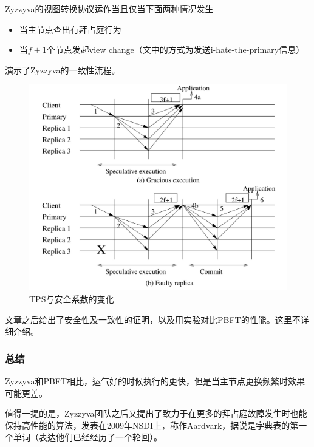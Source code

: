 Zyzzyva的视图转换协议运作当且仅当下面两种情况发生
\begin{itemize}
	\item 当主节点查出有拜占庭行为
	\item 当$f+1$个节点发起view change（文中的方式为发送i-hate-the-primary信息）
\end{itemize}
演示了Zyzzyva的一致性流程。

\begin{figure}
	\centering
	\includegraphics[width=1\textwidth]{../common/zyzzyva_1.png}
	\caption{TPS与安全系数的变化} 
	\label{fig:zyzzyva1}
\end{figure}

文章之后给出了安全性及一致性的证明，以及用实验对比PBFT的性能。这里不详细介绍。

\subsubsection{总结}
Zyzzyva和PBFT相比，运气好的时候执行的更快，但是当主节点更换频繁时效果可能更差。

值得一提的是，Zyzzyva团队之后又提出了致力于在更多的拜占庭故障发生时也能保持高性能的算法，发表在2009年NSDI上，称作Aardvark，据说是字典表的第一个单词（表达他们已经经历了一个轮回）。

